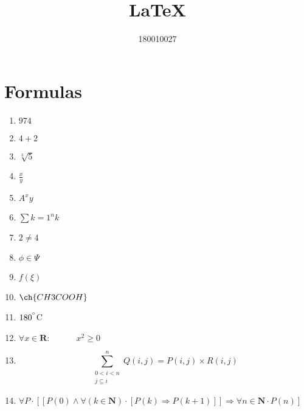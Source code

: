 \documentclass{article}
\title{\LaTeX}
\author{180010027}
\begin{document}
\maketitle{}
\section{Formulas}
	\begin{enumerate}[label=(\alph*)]
	\item$974$
	\item$4 + 2$
	\item$\sqrt[3]5$
	\item$\frac{x}{y}$
	\item$A^x y$
	\item$\sum k = 1^n k$
	\item$2 \neq 4$
	\item$\phi \in \Psi$
	\item$f (\xi)$
	\item$\ch{CH3COOH}$
	\item$180^{\degree}$C
	\item$\forall x \in \mathbf{R}: \quad\quad\quad x^2 \geq 0$
	\item
		\begin{equation*}
			\sum_{\substack{0 < i < n\\{j\subseteq i}}}^{n} Q(i,j) = P(i,j) \times R(i,j)
		\end{equation*}
	\item$\forall P \cdot [[P(0) \wedge \forall(k \in \mathbf{N}) \cdot [P(k)  \Longrightarrow P(k+1)]] \Longrightarrow \forall n \in \mathbf{N} \cdot P(n)]$
\end{enumerate}
\end{document}
